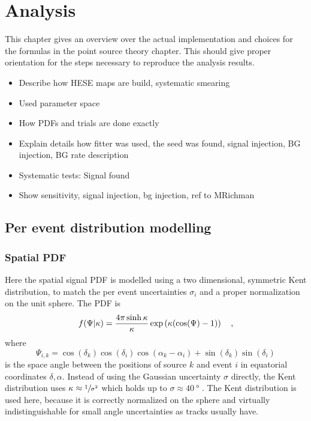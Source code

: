 \chapter{Analysis}

This chapter gives an overview over the actual implementation and choices for the formulas in the point source theory chapter.
This should give proper orientation for the steps necessary to reproduce the analysis results.

\begin{itemize}
  \item Describe how HESE maps are build, systematic smearing
  \item Used parameter space
  \item How PDFs and trials are done exactly
  \item Explain details how fitter was used, the seed was found, signal injection, BG injection, BG rate description
  \item Systematic tests: Signal found
  \item Show sensitivity, signal injection, bg injection, ref to MRichman
\end{itemize}


\section{Per event distribution modelling}
\subsection*{Spatial PDF}
Here the spatial signal PDF is modelled using a two dimensional, symmetric Kent distribution, to match the per event uncertainties $\sigma_i$ and a proper normalization on the unit sphere.
The PDF is
\begin{equation}
  f(\Psi|\kappa)
  = \frac{4\pi \sinh\kappa}{\kappa}\exp\left(\kappa(\cos(\Psi)-1)\right)
  \quad\text{,}
\end{equation}
where
\begin{equation}
  \Psi_{i,k}
  = \cos(\delta_k)\cos(\delta_i)\cos(\alpha_k - \alpha_i) +
    \sin(\delta_k)\sin(\delta_i)
\end{equation}
is the space angle between the positions of source $k$ and event $i$ in equatorial coordinates $\delta, \alpha$.
Instead of using the Gaussian uncertainty $\sigma$ directly, the Kent distribution uses $\kappa \approx \sfrac{1}{\sigma^2}$ which holds up to $\sigma \approx \SI{40}{\degree}$ .
The Kent distribution is used here, because it is correctly normalized on the sphere and virtually indistinguishable for small angle uncertainties as tracks usually have.

